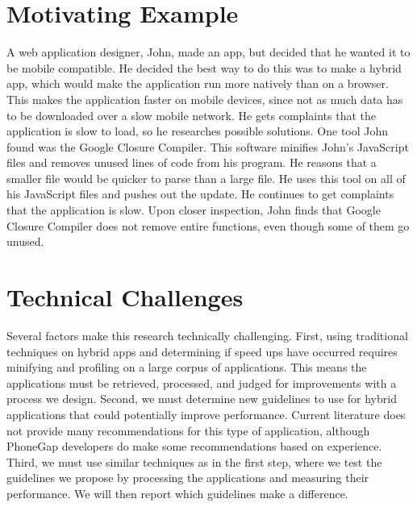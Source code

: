 \documentclass{acm_proc_article-sp}
\begin{document}
\section{Motivating Example} 
A web application designer, John, made an app, but decided that he wanted it to be mobile compatible.
He decided the best way to do this was to make a hybrid app, which would make the application run more natively than on a browser.
This makes the application faster on mobile devices, since not as much data has to be downloaded over a slow mobile network.
He gets complaints that the application is slow to load, so he researches possible solutions.
One tool John found was the Google Closure Compiler.
This software minifies John's JavaScript files and removes unused lines of code from his program.
He reasons that a smaller file would be quicker to parse than a large file.
He uses this tool on all of his JavaScript files and pushes out the update.
He continues to get complaints that the application is slow.
Upon closer inspection, John finds that Google Closure Compiler does not remove entire functions, even though some of them go unused.  

\section{Technical Challenges}
Several factors make this research technically challenging.
First, using traditional techniques on hybrid apps and determining if speed ups have occurred requires minifying and profiling on a large corpus of applications.
This means the applications must be retrieved, processed, and judged for improvements with a process we design.
Second, we must determine new guidelines to use for hybrid applications that could potentially improve performance.
Current literature does not provide many recommendations for this type of application, although PhoneGap developers do make some recommendations based on experience.
Third, we must use similar techniques as in the first step, where we test the guidelines we propose by processing the applications and measuring their performance.  We will then report which guidelines make a difference.
\end{document}
